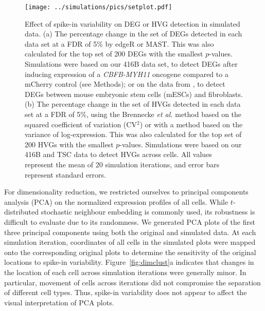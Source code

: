 \documentclass{article}
\begin{document}
\begin{figure}[bt]
    \begin{center}
        \texttt{[image: ../simulations/pics/setplot.pdf]}
    \end{center}
    \caption{Effect of spike-in variability on DEG or HVG detection in simulated data.
        (a) The percentage change in the set of DEGs detected in each data set at a FDR of 5\% by edgeR or MAST.
        This was also calculated for the top set of 200 DEGs with the smallest $p$-values.
        Simulations were based on our 416B data set, to detect DEGs after inducing expression of a \textit{CBFB-MYH11} oncogene compared to a mCherry control (see Methods);
        or on the data from \cite{islam2011characterization}, to detect DEGs between mouse embryonic stem cells (mESCs) and fibroblasts.
        (b) The percentage change in the set of HVGs detected in each data set at a FDR of 5\%,
        using the Brennecke \textit{et al.} method based on the squared coefficient of variation (CV$^2$) or with a method based on the variance of log-expression.
        This was also calculated for the top set of 200 HVGs with the smallest $p$-values.
        Simulations were based on our 416B and TSC data to detect HVGs across cells.
        All values represent the mean of 20 simulation iterations, and error bars represent standard errors.
    }
    \label{fig:setchange}
\end{figure}

For dimensionality reduction, we restricted ourselves to principal components analysis (PCA) on the normalized expression profiles of all cells. 
While $t$-distributed stochastic neighbour embedding \citep{van2008visualizing} is commonly used, its robustness is difficult to evaluate due to its randomness.
We generated PCA plots of the first three principal components using both the original and simulated data.
At each simulation iteration, coordinates of all cells in the simulated plots were mapped onto the corresponding original plots to determine the sensitivity of the original locations to spike-in variability.
Figure~\ref{fig:dimclust}a indicates that changes in the location of each cell across simulation iterations were generally minor.
In particular, movement of cells across iterations did not compromise the separation of different cell types. 
Thus, spike-in variability does not appear to affect the visual interpretation of PCA plots.
\end{document}
